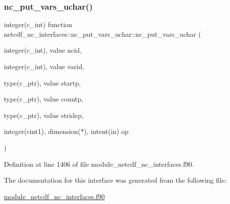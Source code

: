 \subsubsection{\texorpdfstring{nc\+\_\+put\+\_\+vars\+\_\+uchar()}{nc\_put\_vars\_uchar()}}
{\footnotesize\ttfamily integer(c\+\_\+int) function netcdf\+\_\+nc\+\_\+interfaces\+::nc\+\_\+put\+\_\+vars\+\_\+uchar\+::nc\+\_\+put\+\_\+vars\+\_\+uchar (\begin{DoxyParamCaption}\item[{integer(c\+\_\+int), value}]{ncid,  }\item[{integer(c\+\_\+int), value}]{varid,  }\item[{type(c\+\_\+ptr), value}]{startp,  }\item[{type(c\+\_\+ptr), value}]{countp,  }\item[{type(c\+\_\+ptr), value}]{stridep,  }\item[{integer(cint1), dimension($\ast$), intent(in)}]{op }\end{DoxyParamCaption})}



Definition at line 1406 of file module\+\_\+netcdf\+\_\+nc\+\_\+interfaces.\+f90.



The documentation for this interface was generated from the following file\+:\begin{DoxyCompactItemize}
\item 
\hyperlink{module__netcdf__nc__interfaces_8f90}{module\+\_\+netcdf\+\_\+nc\+\_\+interfaces.\+f90}\end{DoxyCompactItemize}
